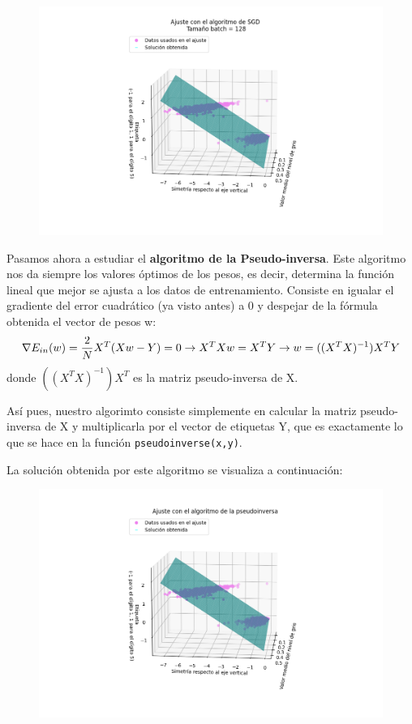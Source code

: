 \documentclass[a4]{article}
\begin{document}
 \begin{figure}[H]
 	\centering
 	\includegraphics[width=1.1\linewidth]{img/tam128}
 	\caption{}
 	\label{fig:tam16}
 \end{figure}
 \vspace{-2mm}
  Pasamos ahora a estudiar el \textbf{algoritmo de la Pseudo-inversa}. Este algoritmo nos da siempre los valores óptimos de los pesos, es decir, determina la función lineal que mejor se ajusta a los datos de entrenamiento. Consiste en igualar el gradiente del error cuadrático (ya visto antes) a 0 y despejar de la fórmula obtenida el vector de pesos w:
  $$\nabla E_{in}(w)=\frac{2}{N} X^T(Xw-Y)=0 \rightarrow X^TXw=X^TY \\ \rightarrow w=((X^TX)^{-1})X^TY$$
  donde $((X^TX)^{-1})X^T$ es la matriz pseudo-inversa de X. 
 
 Así pues, nuestro algorimto consiste simplemente en calcular la matriz pseudo-inversa de X y multiplicarla por el vector de etiquetas Y, que es exactamente lo que se hace en la función \lstinline|pseudoinverse(x,y)|.
 
La solución obtenida por este algoritmo se visualiza a continuación:
 
   \begin{figure}[H]
  	\centering
  	\includegraphics[width=1.1\linewidth]{img/pseudoinversa}
  	\caption{}
  	\label{fig:pseudo-inversa}
  \end{figure}
\vspace{-2mm}
\end{document}
